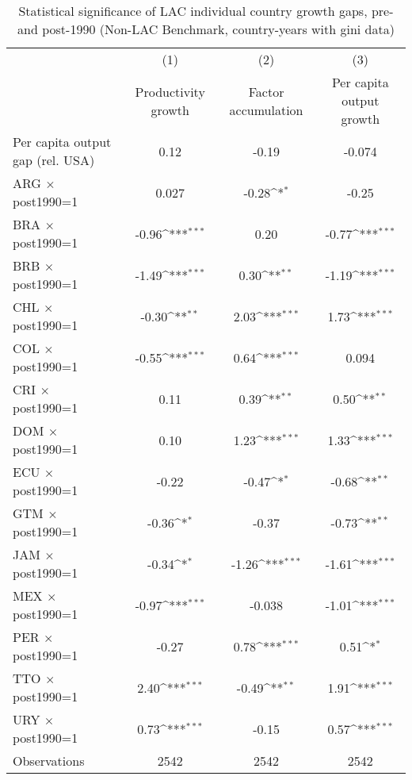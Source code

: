 \begin{table}[htbp]\centering
\def\sym#1{\ifmmode^{#1}\else\(^{#1}\)\fi}
\caption{Statistical significance of LAC individual country growth gaps, pre- and post-1990 (Non-LAC Benchmark, country-years with gini data)}
\begin{tabular}{l*{3}{c}}
\toprule
                &\multicolumn{1}{c}{(1)}&\multicolumn{1}{c}{(2)}&\multicolumn{1}{c}{(3)}\\
                &\multicolumn{1}{c}{Productivity growth}&\multicolumn{1}{c}{Factor accumulation}&\multicolumn{1}{c}{Per capita output growth}\\
\midrule
Per capita output gap (rel. USA)&     0.12         &    -0.19         &   -0.074         \\
ARG $\times$ post1990=1&    0.027         &    -0.28\sym{*}  &    -0.25         \\
BRA $\times$ post1990=1&    -0.96\sym{***}&     0.20         &    -0.77\sym{***}\\
BRB $\times$ post1990=1&    -1.49\sym{***}&     0.30\sym{**} &    -1.19\sym{***}\\
CHL $\times$ post1990=1&    -0.30\sym{**} &     2.03\sym{***}&     1.73\sym{***}\\
COL $\times$ post1990=1&    -0.55\sym{***}&     0.64\sym{***}&    0.094         \\
CRI $\times$ post1990=1&     0.11         &     0.39\sym{**} &     0.50\sym{**} \\
DOM $\times$ post1990=1&     0.10         &     1.23\sym{***}&     1.33\sym{***}\\
ECU $\times$ post1990=1&    -0.22         &    -0.47\sym{*}  &    -0.68\sym{**} \\
GTM $\times$ post1990=1&    -0.36\sym{*}  &    -0.37         &    -0.73\sym{**} \\
JAM $\times$ post1990=1&    -0.34\sym{*}  &    -1.26\sym{***}&    -1.61\sym{***}\\
MEX $\times$ post1990=1&    -0.97\sym{***}&   -0.038         &    -1.01\sym{***}\\
PER $\times$ post1990=1&    -0.27         &     0.78\sym{***}&     0.51\sym{*}  \\
TTO $\times$ post1990=1&     2.40\sym{***}&    -0.49\sym{**} &     1.91\sym{***}\\
URY $\times$ post1990=1&     0.73\sym{***}&    -0.15         &     0.57\sym{***}\\
\midrule
Observations    &     2542         &     2542         &     2542         \\

\end{tabular}
\end{table}
